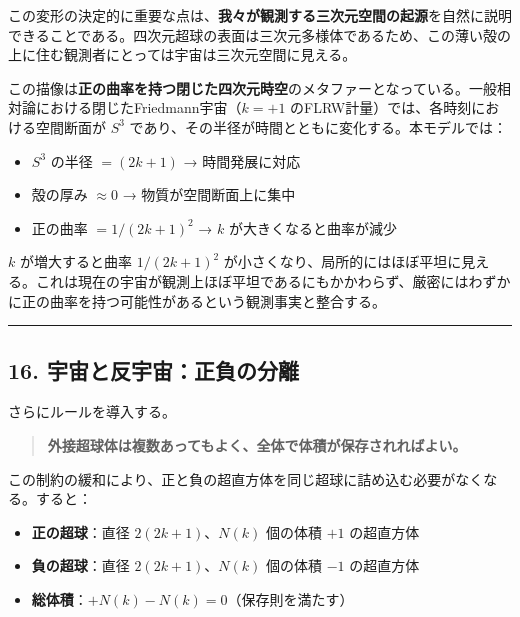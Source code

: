 \documentclass[a4paper,11pt]{ltjsarticle}
\theoremstyle{definition}
\providecommand{\tightlist}{\setlength{\itemsep}{0pt}\setlength{\parskip}{0pt}}
\begin{document}
この変形の決定的に重要な点は、\textbf{我々が観測する三次元空間の起源}を自然に説明できることである。四次元超球の表面は三次元多様体であるため、この薄い殻の上に住む観測者にとっては宇宙は三次元空間に見える。

この描像は\textbf{正の曲率を持つ閉じた四次元時空}のメタファーとなっている。一般相対論における閉じたFriedmann宇宙（\(k = +1\)
のFLRW計量）では、各時刻における空間断面が \(S^3\)
であり、その半径が時間とともに変化する。本モデルでは：

\begin{itemize}
\tightlist
\item
  \(S^3\) の半径 \(= (2k+1)\) → 時間発展に対応
\item
  殻の厚み \(\approx 0\) → 物質が空間断面上に集中
\item
  正の曲率 \(= 1/(2k+1)^2\) → \(k\) が大きくなると曲率が減少
\end{itemize}

\(k\) が増大すると曲率 \(1/(2k+1)^2\)
が小さくなり、局所的にはほぼ平坦に見える。これは現在の宇宙が観測上ほぼ平坦であるにもかかわらず、厳密にはわずかに正の曲率を持つ可能性があるという観測事実と整合する。

\begin{center}\rule{0.5\linewidth}{0.5pt}\end{center}

\subsection{16.
宇宙と反宇宙：正負の分離}\label{ux5b87ux5b99ux3068ux53cdux5b87ux5b99ux6b63ux8ca0ux306eux5206ux96e2}

さらにルールを導入する。

\begin{quote}
\textbf{外接超球体は複数あってもよく、全体で体積が保存されればよい。}
\end{quote}

この制約の緩和により、正と負の超直方体を同じ超球に詰め込む必要がなくなる。すると：

\begin{itemize}
\tightlist
\item
  \textbf{正の超球}：直径 \(2(2k+1)\)、\(N(k)\) 個の体積 \(+1\)
  の超直方体
\item
  \textbf{負の超球}：直径 \(2(2k+1)\)、\(N(k)\) 個の体積 \(-1\)
  の超直方体
\item
  \textbf{総体積}：\(+N(k) - N(k) = 0\)（保存則を満たす）
\end{itemize}
\end{document}
